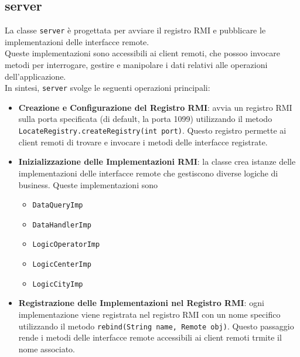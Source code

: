 \subsection{server}
La classe \texttt{server} è progettata per avviare il registro RMI e pubblicare le implementazioni delle interfacce remote.\\
Queste implementazioni sono accessibili ai client remoti, che possoo invocare metodi per interrogare, gestire e manipolare i dati relativi alle operazioni dell'applicazione.\\
In sintesi, \texttt{server} svolge le seguenti operazioni principali:
\begin{itemize}
    \item \textbf{Creazione e Configurazione del Registro RMI}: avvia un registro RMI sulla porta specificata (di default, la porta 1099) utilizzando il metodo\\
          \texttt{LocateRegistry.createRegistry(int port)}. Questo registro permette ai client remoti di trovare e invocare i metodi delle interfacce registrate.
    \item \textbf{Inizializzazione delle Implementazioni RMI}: la classe crea istanze delle implementazioni delle interfacce remote che gestiscono diverse logiche di business.
          Queste implementazioni sono
          \begin{itemize}
              \item \texttt{DataQueryImp}
              \item \texttt{DataHandlerImp}
              \item \texttt{LogicOperatorImp}
              \item \texttt{LogicCenterImp}
              \item \texttt{LogicCityImp}
          \end{itemize}
    \item \textbf{Registrazione delle Implementazioni nel Registro RMI}: ogni implementazione viene registrata nel registro RMI con un nome specifico utilizzando il metodo
          \texttt{rebind(String name, Remote obj)}. Questo passaggio rende i metodi delle interfacce remote accessibili ai client remoti trmite il nome associato.
\end{itemize}

